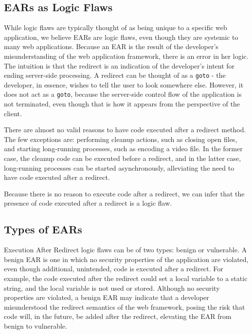 

\subsection{EARs as Logic Flaws}

While logic flaws are typically thought of as being unique to a specific
web application, we believe EARs are logic flaws, even though they are
systemic to many web applications. Because an EAR is the result of the
developer's misunderstanding of the web application framework, there is an
error in her logic. The intuition is that the redirect is an indication of
the developer's intent for ending server-side processing. A redirect can be
thought of as a \texttt{goto} - the developer, in essence, wishes to tell
the user to look somewhere else. However, it does not act as a
\texttt{goto}, because the server-side control flow of the application is
not terminated, even though that is how it appears from the perspective of
the client.

There are almost no valid reasons to have code executed after a redirect
method. The few exceptions are: performing cleanup actions, such as closing
open files, and starting long-running processes, such as encoding a video
file. In the former case, the cleanup code can be executed before a
redirect, and in the latter case, long-running processes can be started
asynchronously, alleviating the need to have code executed after a
redirect.

Because there is no reason to execute code after a redirect, we can
infer that the presence of code executed after a redirect is a logic
flaw. 

\subsection{Types of EARs}

Execution After Redirect logic flaws can be of two types: benign or
vulnerable. A benign EAR is one in which no security properties of the
application are violated, even though additional, unintended, code is
executed after a redirect. For example, the code executed after the
redirect could set a local variable to a static string, and the local
variable is not used or stored. Although no security properties are
violated, a benign EAR may indicate that a developer misunderstood the
redirect semantics of the web framework, posing the risk that code
will, in the future, be added after the redirect, elevating the EAR
from benign to vulnerable.

